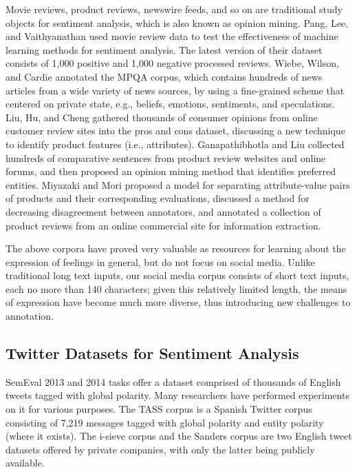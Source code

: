\documentclass[english]{jnlp_1.4}
\begin{document}
Movie reviews, product reviews, newswire feeds, and so on are traditional study objects for sentiment analysis, which is also known as opinion mining. Pang, Lee, and Vaithyanathan \citeyear{Pang02} used movie review data to test the effectiveness of machine learning methods for sentiment analysis. The latest version of their dataset consists of 1,000 positive and 1,000 negative processed reviews. Wiebe, Wilson, and Cardie \citeyear{Wiebe05} annotated the MPQA corpus, which contains hundreds of news articles from a wide variety of news sources, by using a fine-grained scheme that centered on private state, e.g., beliefs, emotions, sentiments, and speculations. Liu, Hu, and Cheng \citeyear{Liu05} gathered thousands of consumer opinions from online customer review sites into the pros and cons dataset, discussing a new technique to identify product features (i.e., attributes). Ganapathibhotla and Liu \citeyear{Ganapathibhotla08} collected hundreds of comparative sentences from product review websites and online forums, and then proposed an opinion mining method that identifies preferred entities. Miyazaki and Mori \citeyear{Miyazaki10} proposed a model for separating attribute-value pairs of products and their corresponding evaluations, discussed a method for decreasing disagreement between annotators, and annotated a collection of product reviews from an online commercial site for information extraction.

The above corpora have proved very valuable as resources for learning about the expression of feelings in general, but do not focus on social media. Unlike traditional long text inputs, our social media corpus consists of short text inputs, each no more than 140 characters; given this relatively limited length, the means of expression have become much more diverse, thus introducing new challenges to annotation.


\subsection{Twitter Datasets for Sentiment Analysis}

SemEval 2013 and 2014 tasks \cite{Nakov13,Rosenthal14} offer a dataset comprised of thousands of English tweets tagged with global polarity. Many researchers \cite{Balahur13,Xiang14} have performed experiments on it for various purposes. The TASS corpus \cite{Villena14} is a Spanish Twitter corpus consisting of 7,219 messages tagged with global polarity and entity polarity (where it exists). The i-sieve corpus \cite{Kouloumpis11} and the Sanders corpus \cite{Sidorenko13} are two English tweet datasets offered by private companies, with only the latter being publicly available. 
\end{document}
